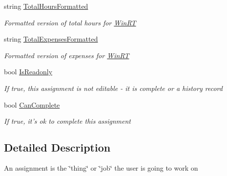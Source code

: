 \begin{DoxyCompactItemize}
string \hyperlink{class_field_service_1_1_data_1_1_assignment_ae016207c39635002331756b6083dd5bf}{Total\+Hours\+Formatted}
\begin{DoxyCompactList}\small\item\em Formatted version of total hours for \hyperlink{namespace_field_service_1_1_win_r_t}{Win\+R\+T} \end{DoxyCompactList}\item 
string \hyperlink{class_field_service_1_1_data_1_1_assignment_a8e86c4baa5f523a371239440149cf858}{Total\+Expenses\+Formatted}
\begin{DoxyCompactList}\small\item\em Formatted version of expenses for \hyperlink{namespace_field_service_1_1_win_r_t}{Win\+R\+T} \end{DoxyCompactList}\item 
bool \hyperlink{class_field_service_1_1_data_1_1_assignment_a62ea5221113e69d186cd59f88c247d04}{Is\+Readonly}
\begin{DoxyCompactList}\small\item\em If true, this assignment is not editable -\/ it is complete or a history record \end{DoxyCompactList}\item 
bool \hyperlink{class_field_service_1_1_data_1_1_assignment_a4b8c35afb1178923213bed8490e25ec5}{Can\+Complete}
\begin{DoxyCompactList}\small\item\em If true, it's ok to complete this assignment \end{DoxyCompactList}\end{DoxyCompactItemize}


\subsection{Detailed Description}
An assignment is the \char`\"{}thing\char`\"{} or \char`\"{}job\char`\"{} the user is going to work on 



